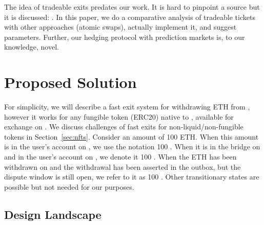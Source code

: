 The idea of tradeable exits predates our work. It is hard to pinpoint a source but it is discussed: . In this paper, we do a comparative analysis of tradeable tickets with other approaches (atomic swaps), actually implement it, and suggest parameters. Further, our hedging protocol with prediction markets is, to our knowledge, novel.


\section{Proposed Solution} 

For simplicity, we will describe a fast exit system for withdrawing ETH from \layertwo, however it works for any fungible token (\eg ERC20) native to \layerone, available for exchange on \layerone. We discuss challenges of fast exits for non-liquid/non-fungible tokens in Section~\ref{sec:nfts}. Consider an amount of 100 ETH. When this amount is in the user's account on \layerone, we use the notation 100 \ethone. When it is in the bridge on \layerone and in the user's account on \layertwo, we denote it 100 \ethtwo. When the ETH has been withdrawn on \layertwo and the withdrawal has been asserted in the \layerone outbox, but the dispute window is still open, we refer to it as 100 \ethxx. Other transitionary states are possible but not needed for our purposes.

\subsection{Design Landscape}

